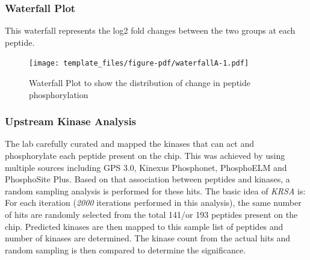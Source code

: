 \documentclass[
  letterpaper,
  DIV=11,
  numbers=noendperiod]{scrreport}
\begin{document}
\hypertarget{waterfall-plot}{%
\subsubsection{Waterfall Plot}\label{waterfall-plot}}

This waterfall represents the log2 fold changes between the two groups
at each peptide.

\begin{figure}[htbp]

{\centering \texttt{[image: template\_files/figure-pdf/waterfallA-1.pdf]}

}

\caption{Waterfall Plot to show the distribution of change in peptide
phosphorylation}

\end{figure}

\hypertarget{upstream-kinase-analysis}{%
\subsubsection{Upstream Kinase
Analysis}\label{upstream-kinase-analysis}}

The lab carefully curated and mapped the kinases that can act and
phosphorylate each peptide present on the chip. This was achieved by
using multiple sources including GPS 3.0, Kinexus Phosphonet, PhosphoELM
and PhosphoSite Plus. Based on that association between peptides and
kinases, a random sampling analysis is performed for these hits. The
basic idea of \emph{KRSA} is: For each iteration (\emph{2000} iterations
performed in this analysis), the same number of hits are randomly
selected from the total 141/or 193 peptides present on the chip.
Predicted kinases are then mapped to this sample list of peptides and
number of kinases are determined. The kinase count from the actual hits
and random sampling is then compared to determine the significance.
\end{document}
